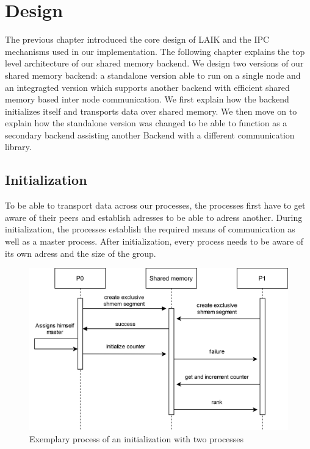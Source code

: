 
\chapter{Design}\label{chapter:design}

The previous chapter introduced the core design of LAIK and the IPC mechanisms used in our implementation.
The following chapter explains the top level architecture of our shared memory backend. 
We design two versions of our shared memory backend: a standalone version able  to run on a single node and an integragted version which supports another backend with efficient shared memory based inter node communication.
We first explain how the backend initializes itself and transports data over shared memory.
We then move on to explain how the standalone version was changed to be able to function as a secondary backend assisting another Backend with a different communication library.

\section{Initialization} \label{section:initialization}

To be able to transport data across our processes, the processes first have to get aware of their peers and establish adresses to be able to adress another. 
During initialization, the processes establish the required means of communication as well as a master process.
After initialization, every process needs to be aware of its own adress and the size of the group.

\begin{figure}[h]
	\centering
	\includegraphics[width=0.75\columnwidth]{figures/initialization.png}
	\caption{Exemplary process of an initialization with two processes}
	\label{fig:initialization}
\end{figure}

